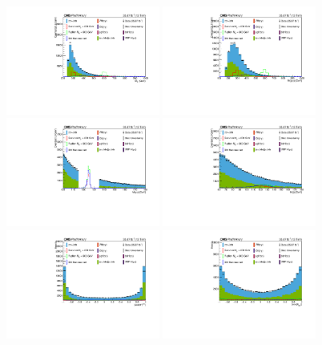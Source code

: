 \begin{figure}[thb]
  \centering
\includegraphics[width=0.45\textwidth]{figures/sec-control/NP_MXprime.pdf}\hfil
\includegraphics[width=0.45\textwidth]{figures/sec-control/NP_dicandidate_Mass.pdf}\hfil
\includegraphics[width=0.45\textwidth]{figures/sec-control/NP_diPho_Mass.pdf}\hfil
\includegraphics[width=0.45\textwidth]{figures/sec-control/NP_diJet_Mass.pdf}\hfil
\includegraphics[width=0.45\textwidth]{figures/sec-control/NP_CosThetaStar_CS.pdf}\hfil
\includegraphics[width=0.45\textwidth]{figures/sec-control/NP_CosTheta_bb.pdf}\hfil


\end{figure}
